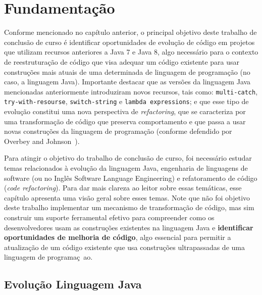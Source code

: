 %
%
\chapter{Fundamentaç\~{a}o}

Conforme mencionado no cap\'{i}tulo anterior, o principal objetivo deste trabalho de conclus\~{a}o de curso \'{e} 
identificar oportunidades de evoluç\~{a}o de c\'{o}digo em projetos que utilizam recursos anteriores a Java 7 e Java 8, 
algo necess\'{a}rio para o contexto de reestrutura\c c\~{a}o de c\'{o}digo que visa adequar um c\'{o}digo 
existente para usar constru\c c\~{o}es mais atuais de uma determinada de linguagem de programa\c c\~{a}o 
(no caso, a linguagem Java). Importante destacar que as vers\~{o}es da linguagem Java mencionadas anteriormente
introduziram novos recursos, tais como: \texttt{multi-catch}, \texttt{try-with-resourse}, \texttt{switch-string} 
e \texttt{lambda expressions}; e que esse tipo de evoluç\~{a}o constitui uma nova perspectiva de \textit{refactoring}, que se caracteriza 
por uma transforma\c c\~{a}o de c\'{o}digo que preserva comportamento e que passa a usar  
novas constru\c c\~{o}es da linguagem de programa\c c\~{a}o (conforme defendido por Overbey and Johnson~\cite{Overbey:2009}). 

Para atingir o objetivo do trabalho de conclus\~{a}o de curso, foi necess\'{a}rio estudar temas relacionados 
\`{a} evolu\c c\~{a}o da linguagem Java, engenharia de linguagens de software (ou no Ingl\^{e}s Software 
Language Engineering) e refatoramento de c\'{o}digo (\emph{code refactoring}).  Para dar mais clareza ao leitor 
sobre essas tem\'{a}ticas, esse cap\'{i}tulo apresenta uma vis\~{a}o geral sobre esses temas. Note que n\~{a}o foi objetivo
deste trabalho implementar um mecanismo de transforma\c c\~{a}o de c\'{o}digo, mas sim construir um suporte ferramental 
efetivo para compreender como os desenvolvedores usam as constru\c c\~{o}es existentes na linguagem Java e {\bf identificar 
oportunidades de melhoria de c\'{o}digo}, algo essencial para permitir a atualiza\c c\~{a}o de um c\'{o}digo existente 
que usa constru\c c\~{o}es ultrapassadas de uma linguagem de programa\c c~{a}o. 
 
\section{Evoluç\~{a}o Linguagem Java}\label{sec:evolucaoJava}



